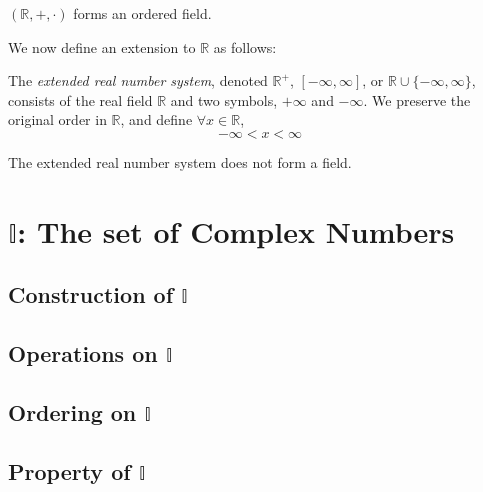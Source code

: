 \documentclass{report}
\begin{document}
			\begin{thm}
				$(\mathbb{R},+,\cdot)$ forms an ordered field.
			\end{thm}

			We now define an extension to $\mathbb{R}$ as follows:

			\begin{defn} \label{def_extended_real_number_system}
				The \emph{extended real number system}, denoted $\mathbb{R}^+$, $[-\infty,\infty]$, or $\mathbb{R} \cup \{-\infty,\infty\}$, consists of the real field $\mathbb{R}$ and two symbols, $+\infty$ and $-\infty$. We preserve the original order in $\mathbb{R}$, and define $\forall x \in \mathbb{R}$,
				\begin{displaymath}
				-\infty<x<\infty
				\end{displaymath}
			\end{defn}
			
			\begin{remark} \label{remark_extended_real_number_system_not_field}
				The extended real number system does not form a field.
			\end{remark}

	\section{$\mathbb{I}$: The set of Complex Numbers}
		\subsection{Construction of $\mathbb{I}$}
		
			
		
		\subsection{Operations on $\mathbb{I}$}
		
			
		
		\subsection{Ordering on $\mathbb{I}$}
		
			
		
		\subsection{Property of $\mathbb{I}$}
		
			
		
\end{document}
